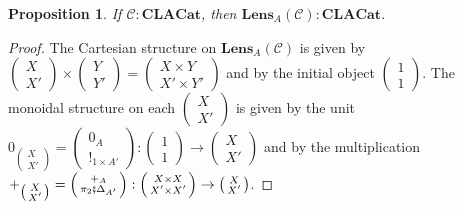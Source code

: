 \documentclass[12pt,a4paper,openright,twoside]{report}
\theoremstyle{plain}
\newtheorem{proposition}{Proposition}
\theoremstyle{definition}
\begin{document}
\begin{proposition}
  If $\mathcal{C} : \mathbf{CLACat}$, then $\mathbf{Lens}_A(\mathcal{C}) : \mathbf{CLACat}$.
\end{proposition}
\begin{proof}
  The Cartesian structure on $\mathbf{Lens}_A(\mathcal{C})$ is given by $\left(\begin{smallmatrix}X \\ X'\end{smallmatrix}\right) \times \left(\begin{smallmatrix}Y \\ Y'\end{smallmatrix}\right) = \left(\begin{smallmatrix}X\times Y \\ X' \times Y'\end{smallmatrix}\right)$ and by the initial object $\left(\begin{smallmatrix}1 \\ 1\end{smallmatrix}\right)$. The monoidal structure on each $\left(\begin{smallmatrix}X \\ X'\end{smallmatrix}\right)$ is given by the unit $0_{\left(\begin{smallmatrix}X \\ X'\end{smallmatrix}\right)} = \left(\begin{smallmatrix}0_A \\ !_{1 \times A'}\end{smallmatrix}\right): \left(\begin{smallmatrix}1 \\ 1\end{smallmatrix}\right) \to \left(\begin{smallmatrix}X \\ X'\end{smallmatrix}\right)$ and by the multiplication $+_{\left(\begin{smallmatrix}X \\ X'\end{smallmatrix}\right)} = \left(\begin{smallmatrix}+_A \\ \pi_2 \fatsemi \Delta_{A'}\end{smallmatrix}\right): \left(\begin{smallmatrix}X \times X \\ X' \times X'\end{smallmatrix}\right) \to \left(\begin{smallmatrix}X \\ X'\end{smallmatrix}\right)$.
\end{proof}
\end{document}
